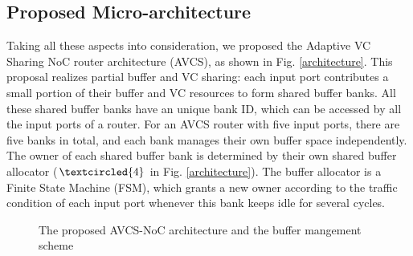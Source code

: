 \documentclass[10pt,conference]{IEEEtran}
\begin{document}
\subsection{Proposed Micro-architecture}
Taking all these aspects into consideration, we proposed the Adaptive VC Sharing NoC router architecture (AVCS), as shown in Fig. \ref{architecture}. This proposal realizes partial buffer and VC sharing: each input port contributes a small portion of their buffer and VC resources to form shared buffer banks. All these shared buffer banks have an unique bank ID, which can be accessed by all the input ports of a router. For an AVCS router with five input ports, there are five banks in total, and each bank manages their own buffer space independently. The owner of each shared buffer bank is determined by their own shared buffer allocator ($\textcircled{4}$ in Fig. \ref{architecture}). The buffer allocator is a Finite State Machine (FSM), which grants a new owner according to the traffic condition of each input port whenever this bank keeps idle for several cycles.
\begin{figure}
  \centering
  \hspace{10pt}
  \caption{The proposed AVCS-NoC architecture and the buffer mangement scheme}
\end{figure}
\end{document}
